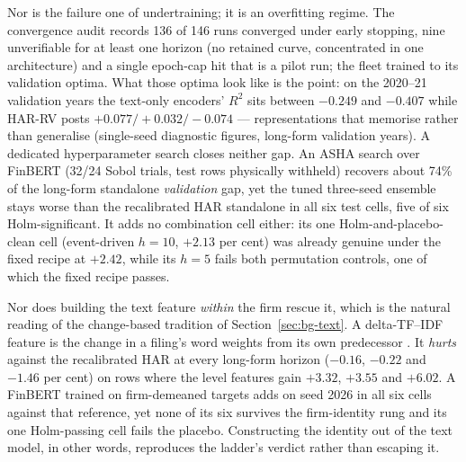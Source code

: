 Nor is the failure one of undertraining; it is an overfitting regime. The convergence audit records 136 of 146 runs converged under early stopping, nine unverifiable for at least one horizon (no retained curve, concentrated in one architecture) and a single epoch-cap hit that is a pilot run; the fleet trained to its validation optima. %
What those optima look like is the point: on the 2020--21 validation years the text-only encoders' $R^2$ sits between $-0.249$ and $-0.407$ while HAR-RV posts $+0.077/+0.032/-0.074$ --- representations that memorise rather than generalise (single-seed diagnostic figures, long-form validation years). %
A dedicated hyperparameter search closes neither gap. An ASHA search over FinBERT (32/24 Sobol trials, test rows physically withheld) recovers about 74\% of the long-form standalone \emph{validation} gap, yet the tuned three-seed ensemble stays worse than the recalibrated HAR standalone in all six test cells, five of six Holm-significant. It adds no combination cell either: its one Holm-and-placebo-clean cell (event-driven $h=10$, $+2.13$ per cent) was already genuine under the fixed recipe at $+2.42$, while its $h=5$ fails both permutation controls, one of which the fixed recipe passes. %

Nor does building the text feature \emph{within} the firm rescue it, which is the natural reading of the change-based tradition of Section~\ref{sec:bg-text}. A delta-TF--IDF feature is the change in a filing's word weights from its own predecessor \cite{cohen2020lazy}. It \emph{hurts} against the recalibrated HAR at every long-form horizon ($-0.16$, $-0.22$ and $-1.46$ per cent) on rows where the level features gain $+3.32$, $+3.55$ and $+6.02$. A FinBERT trained on firm-demeaned targets adds on seed 2026 in all six cells against that reference, yet none of its six survives the firm-identity rung and its one Holm-passing cell fails the placebo. Constructing the identity out of the text model, in other words, reproduces the ladder's verdict rather than escaping it. %

